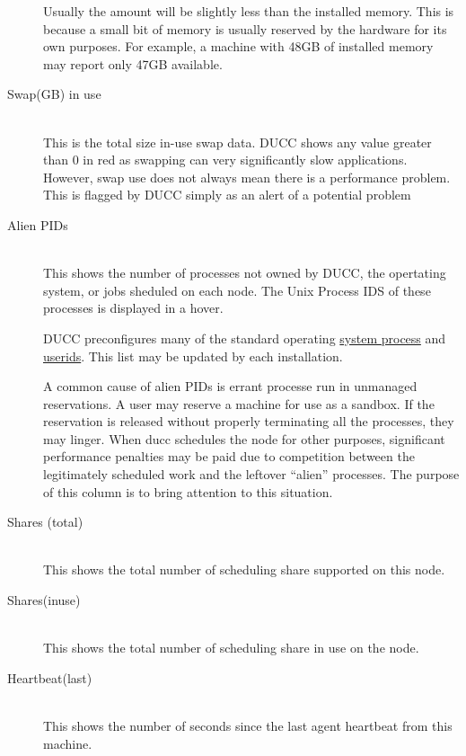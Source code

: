 \begin{description}
        Usually the amount will be slightly less than the installed memory.  This is because
        a small bit of memory is usually reserved by the hardware for its own purposes.  For 
        example, a machine with 48GB of installed memory may report only 47GB available.

      \item[Swap(GB) in use] \hfill \\
        This is the total size in-use swap data.  DUCC shows any value greater than 0 in
        red as swapping can very significantly slow applications.  However, swap use does
        not always mean there is a performance problem.  This is flagged by DUCC simply
        as an alert of a potential problem

      \item[Alien PIDs] \hfill \\
        This shows the number of processes not owned by DUCC, the opertating system, or
        jobs sheduled on each node.  The Unix Process IDS of these processes is displayed
        in a hover.

        DUCC preconfigures many of the standard operating 
        \hyperref[itm:props-rogue.process]{system process} and 
        \hyperref[itm:props-rogue.user]{userids}.  This list may be updated by each
        installation.

        A common cause of alien PIDs is errant processe run in unmanaged reservations.  A
        user may reserve a machine for use as a sandbox.  If the reservation is released
        without properly terminating all the processes, they may linger.  When ducc 
        schedules the node for other purposes, significant performance penalties may be
        paid due to competition between the legitimately scheduled work and the leftover
        ``alien'' processes.  The purpose of this column is to bring attention to this situation.

      \item[Shares (total)] \hfill \\
        This shows the total number of scheduling share supported on this node.

      \item[Shares(inuse)] \hfill \\
        This shows the total number of scheduling share in use on the node.

      \item[Heartbeat(last)] \hfill \\
        This shows the number of seconds since the last agent heartbeat from this machine.

      \end{description}
      
